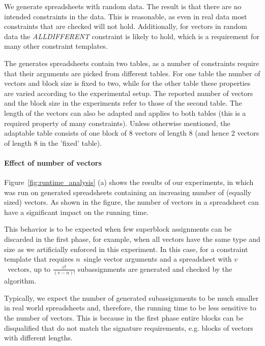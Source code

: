 We generate spreadsheets with random data. The result is that there are no intended constraints in the data. This is reasonable, as even in real data most constraints that are checked will not hold. Additionally, for vectors in random data the \textit{ALLDIFFERENT} constraint is likely to hold, which is a requirement for many other constraint templates.

The generates spreadsheets contain two tables, as a number of constraints require that their arguments are picked from different tables. For one table the number of vectors and block size is fixed to two, while for the other table these properties are varied according to the experimental setup.
The reported number of vectors and the block size in the experiments refer to those of the second table. The length of the vectors can also be adapted and applies to both tables (this is a required property of many constraints).
Unless otherwise mentioned, the adaptable table consists of one block of $8$ vectors of length $8$ (and hence 2 vectors of length $8$ in the 'fixed' table).



\paragraph{Effect of number of vectors}
Figure~\ref{fig:runtime_analysis} (a) shows the results of our experiments, in which \sname was run on generated spreadsheets containing an increasing number of (equally sized) vectors.
As shown in the figure, the number of vectors in a spreadsheet can have a significant impact on the running time.

This behavior is to be expected when few superblock assignments can be discarded in the first phase, for example, when all vectors have the same type and size as we artificially enforced in this experiment.
In this case, for a constraint template that requires $n$~single vector arguments and a spreadsheet with $v$~vectors, up to $\frac{v!}{(v - n)!}$ subassignments are generated and checked by the algorithm.

Typically, we expect the number of generated subassignments to be much smaller in real world spreadsheets and, therefore, the running time to be less sensitive to the number of vectors.
This is because in the first phase entire blocks can be disqualified that do not match the signature requirements, e.g. blocks of vectors with different lengths. %


